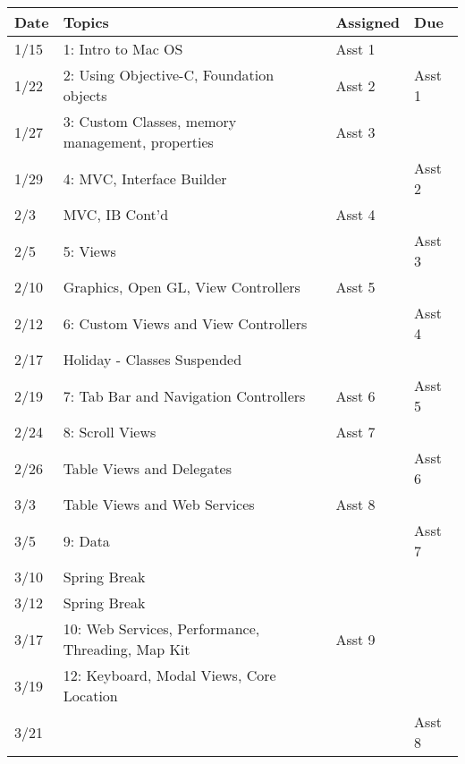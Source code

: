 \documentclass[11pt]{article}
\begin{document}
\small
\begin{centering}
\begin{tabular}{||l|p{3in}|l|l||}
\hline\hline
Date & Topics  & Assigned & Due  \\
\hline\hline
1/15 & 1: Intro to Mac OS & Asst 1 & \\
\hline

1/22 & 2: Using Objective-C, Foundation objects & Asst 2 & Asst 1\\
\hline

1/27 & 3: Custom Classes, memory management, properties & Asst 3 & \\
1/29 & 4: MVC, Interface Builder & & Asst 2\\
\hline

2/3 & MVC, IB Cont'd & Asst 4 & \\
2/5 & 5: Views &  & Asst 3\\
\hline

2/10 & Graphics, Open GL, View Controllers & Asst 5& \\
2/12 & 6: Custom Views and View Controllers &  & Asst 4 \\
\hline

2/17 & Holiday - Classes Suspended & & \\
2/19 & 7: Tab Bar and Navigation Controllers & Asst 6 & Asst 5\\
\hline

2/24 & 8: Scroll Views & Asst 7& \\
2/26 & Table Views and Delegates &  & Asst 6\\
\hline

3/3 & Table Views and Web Services & Asst 8 & \\
3/5 & 9: Data &  &Asst 7\\
\hline

3/10 & Spring Break &&\\
3/12 & Spring Break &&\\
\hline

3/17 & 10: Web Services, Performance, Threading, Map Kit & Asst 9 & \\
3/19 & 12:  Keyboard, Modal Views, Core Location &  & \\
3/21 &&& Asst 8 \\
\hline


\end{tabular}
\end{centering}
\end{document}
